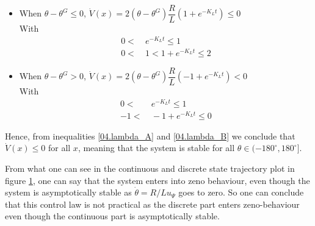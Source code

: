 \begin{itemize}
  \item When $\theta - \theta^G \leq 0$, $\dot{V}(x) = 2 (\theta - \theta^G) \dfrac{R}{L} (1 + e^{-K_L t}) \leq 0$ \\
    With
    \begin{align}
      0 <&\ e^{-K_L t} \leq 1 \nonumber \\
      0 <&\ 1 < 1 + e^{-K_L t} \leq 2 \label{04.lambda_A}
    \end{align}
  \item When $\theta - \theta^G > 0$, $\dot{V}(x) = 2 (\theta - \theta^G) \dfrac{R}{L} (-1 + e^{-K_L t}) < 0$  \\
    With
    \begin{align}
      0 <&\ e^{-K_L t} \leq 1 \nonumber \\
      -1 <&\ -1 + e^{-K_L t} \leq 0 \label{04.lambda_B}
    \end{align}
\end{itemize}


Hence, from inequalities \ref{04.lambda_A} and \ref{04.lambda_B} we conclude
that $\dot{V}(x) \leq 0$ for all $x$, meaning that the system is stable for all
$\theta \in (-180^{\circ}, 180^{\circ}]$.

From what one can see in the continuous and discrete state trajectory plot in
figure \ref{fig:04}, one can say that the system enters into zeno behaviour,
even though the system is asymptotically stable as $\dot{\theta}=R /Lu_\Psi$
goes to zero. So one can conclude that this control law is not practical as
the discrete part enters zeno-behaviour even though the continuous part is
asymptotically stable.

\begin{figure}[H]\centering
  \scalebox{0.9}{}
  \caption{}
  \label{fig:04}
\end{figure}
